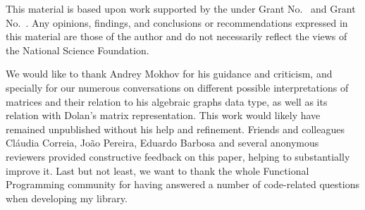 \documentclass[sigplan]{acmart}\settopmatter{}
\begin{document}
\begin{acks} %
  This material is based upon work supported by the
   under Grant
  No.~ and Grant
  No.~.  Any opinions, findings, and
  conclusions or recommendations expressed in this material are those
  of the author and do not necessarily reflect the views of the
  National Science Foundation.
  
  We would like to thank Andrey Mokhov for his guidance and criticism, and specially for our numerous conversations on different possible interpretations of matrices and their relation to his algebraic graphs data type, as well as its relation with Dolan's matrix representation. This work would likely have remained unpublished without his help and refinement. Friends and colleagues Cláudia Correia, João Pereira, Eduardo Barbosa and several anonymous reviewers provided constructive feedback on this paper, helping to substantially improve it. Last but not least, we want to thank the whole Functional Programming community for having answered a number of code-related questions when developing my library.
\end{acks}



\end{document}
